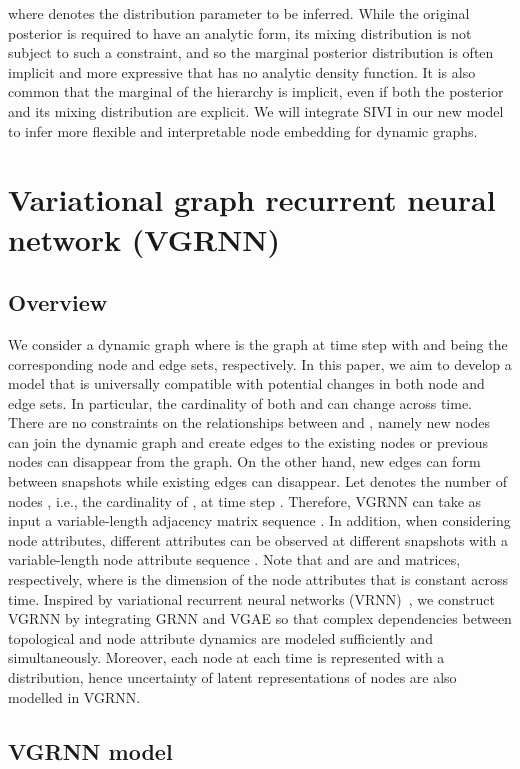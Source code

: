 \documentclass{article}
\begin{document}
where 
\fi
 denotes the distribution parameter to be inferred. While the original posterior  is required to have an analytic form, its mixing distribution is not subject to such a constraint, and so the marginal posterior distribution is often implicit and more expressive that has no
analytic density function. It is also common that the marginal of the hierarchy is implicit, even if both the posterior and its mixing distribution are explicit. We will integrate SIVI in our new model to infer more flexible and interpretable node embedding for dynamic graphs.


\section{Variational graph recurrent neural network (VGRNN)}

\subsection{Overview}

We consider a dynamic graph  where   is the graph at time step  with  and  being the corresponding node and edge sets, respectively. 
In this paper, we aim to develop a model that is universally compatible with potential changes in both node and edge sets. In particular, the cardinality of both  and  can change across time. There are no constraints on the relationships between  and , namely new nodes can join the dynamic graph and create edges to the existing nodes or previous nodes can disappear from the graph. On the other hand, new edges can form between snapshots while existing edges can disappear.
{ Let  denotes the number of nodes 
, i.e., the cardinality of , 
at time step .}
Therefore, VGRNN can take as input a variable-length adjacency matrix sequence . In addition, when considering node attributes, different attributes can be observed at different snapshots with a variable-length node attribute sequence .
{Note that  and  are  and  matrices, respectively, where  
is the dimension of the node attributes that 
is constant across time.}
Inspired by variational recurrent neural networks (VRNN)~\cite{chung2015recurrent}, we construct VGRNN by integrating GRNN and VGAE so that complex dependencies between topological and node attribute dynamics are modeled sufficiently and simultaneously. Moreover, each node at each time is represented with a distribution, hence uncertainty of latent representations of nodes are also modelled in VGRNN. 


\subsection{VGRNN model}
\end{document}
